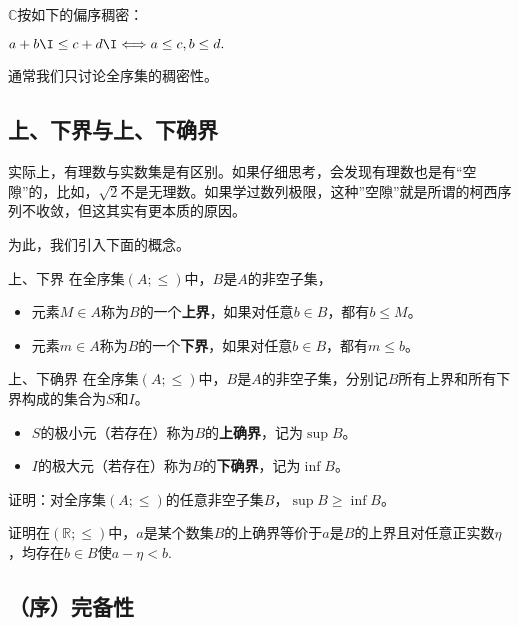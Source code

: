 \begin{example}{}
$\mathbb{C}$按如下的偏序稠密：

$a+b\I\leq c+d\I\Longleftrightarrow a\leq c,b\leq d.$

通常我们只讨论全序集的稠密性。
\end{example}

\subsection{上、下界与上、下确界}

实际上，有理数与实数集是有区别。如果仔细思考，会发现有理数也是有“空隙”的，比如，$\sqrt{2}$不是无理数。如果学过数列极限，这种”空隙”就是所谓的柯西序列不收敛，但这其实有更本质的原因。

为此，我们引入下面的概念。

\begin{definition}{上、下界}
在全序集$(A;\leq)$中，$B$是$A$的非空子集，
\begin{itemize}
\item 元素$M\in A$称为$B$的一个\textbf{上界}，如果对任意$b\in B$，都有$b\leq M$。
\item 元素$m\in A$称为$B$的一个\textbf{下界}，如果对任意$b\in B$，都有$m\leq b$。
\end{itemize}
\end{definition}

\begin{definition}{上、下确界}
在全序集$(A;\leq)$中，$B$是$A$的非空子集，分别记$B$所有上界和所有下界构成的集合为$S$和$I$。
\begin{itemize}
\item $S$的极小元（若存在）称为$B$的\textbf{上确界}，记为$\sup B$。
\item $I$的极大元（若存在）称为$B$的\textbf{下确界}，记为$\inf B$。
\end{itemize}
\end{definition}
\begin{exercise}{}
证明：对全序集$(A;\leq)$的任意非空子集$B$，$\sup B\geq\inf B$。
\end{exercise}
\begin{exercise}{}
证明在$(\mathbb{R};\leq)$中，$a$是某个数集$B$的上确界等价于$a$是$B$的上界且对任意正实数$\eta$，均存在$b\in B$使$a-\eta<b$.
\end{exercise}
\subsection{（序）完备性}

